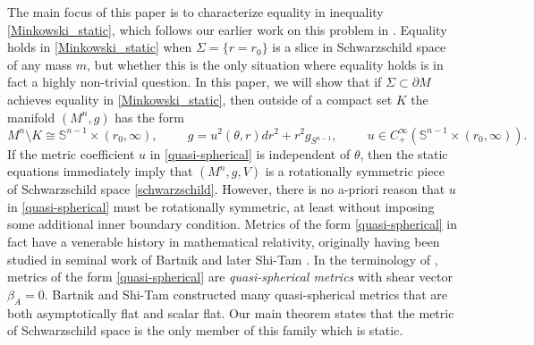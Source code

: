 \documentclass[12pt,twoside]{article}
\theoremstyle{plain}
\theoremstyle{definition}
\theoremstyle{remark}
\numberwithin{equation}{section}
\begin{document}
The main focus of this paper is to characterize equality in inequality \eqref{Minkowski_static}, which follows our earlier work on this problem in \cite{HW}. Equality holds in \eqref{Minkowski_static} when $\Sigma= \{ r = r_{0} \}$ is a slice in Schwarzschild space of any mass $m$, but whether this is the only situation where equality holds is in fact a highly non-trivial question. In this paper, we will show that if $\Sigma \subset \partial M$ achieves equality in \eqref{Minkowski_static}, then outside of a compact set $K$ the manifold $(M^{n},g)$ has the form 
\begin{equation} \label{quasi-spherical}
    M^{n} \setminus K \cong \mathbb{S}^{n-1} \times (r_{0},\infty), \hspace{1cm} g= u^{2}(\theta,r) dr^{2} + r^{2}g_{S^{n-1}}, \hspace{1cm} u \in C^{\infty}_{+}(\mathbb{S}^{n-1} \times (r_{0},\infty)).
\end{equation} 
If the metric coefficient $u$ in \eqref{quasi-spherical} is independent of $\theta$, then the static equations immediately imply that $(M^{n},g,V)$ is a rotationally symmetric piece of Schwarzschild space \eqref{schwarzschild}. However, there is no a-priori reason that $u$ in \eqref{quasi-spherical} must be rotationally symmetric, at least without imposing some additional inner boundary condition. Metrics of the form \eqref{quasi-spherical} in fact have a venerable history in mathematical relativity, originally having been studied in seminal work of Bartnik \cite{B} and later Shi-Tam \cite{ST}. In the terminology of \cite{B}, metrics of the form \eqref{quasi-spherical} are \textit{quasi-spherical metrics} with shear vector $\beta_{A}=0$. Bartnik and Shi-Tam constructed many quasi-spherical metrics that are both asymptotically flat and scalar flat. Our main theorem states that the metric of Schwarzschild space is the only member of this family which is static.
\end{document}
